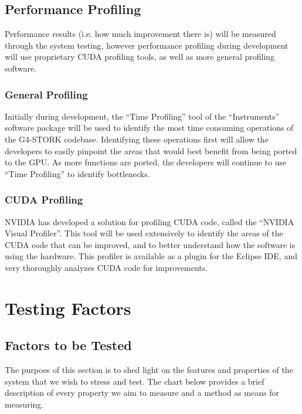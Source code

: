 \documentclass[12pt]{article}
\begin{document}
\subsection{Performance Profiling}
Performance results (i.e. how much improvement there is) will be measured through the system testing, however performance profiling during development will use proprietary CUDA profiling tools, as well as more general profiling software. 

\subsubsection{General Profiling}
Initially during development, the ``Time Profiling'' tool of the ``Instruments'' software package will be used to identify the most time consuming operations of the G4-STORK codebase. Identifying these operations first will allow the developers to easily pinpoint the areas that would best benefit from being ported to the GPU. As more functions are ported, the developers will continue to use ``Time Profiling'' to identify bottlenecks.

\subsubsection{CUDA Profiling}
NVIDIA has developed a solution for profiling CUDA code, called the ``NVIDIA Visual Profiler''. This tool will be used extensively to identify the areas of the CUDA code that can be improved, and to better understand how the software is using the hardware. This profiler is available as a plugin for the Eclipse IDE, and very thoroughly analyzes CUDA code for improvements.

\section{Testing Factors}

\subsection{Factors to be Tested} %
The purpoes of this section is to shed light on the features and properties of the system that we wish to stress and test. The chart below provides a brief description of every property we aim to measure and a method as means for measuring.\\
\end{document}
